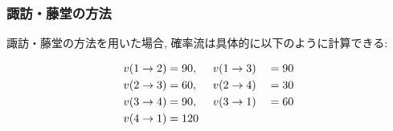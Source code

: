 \subsubsection{諏訪・藤堂の方法}
諏訪・藤堂の方法を用いた場合, 確率流は具体的に以下のように計算できる:

\begin{alignat}{4}
    v(1 \to 2) &= 90,~~~~ v(1 \to 3) &&= 90 \notag \\
    v(2 \to 3) &= 60,~~~~ v(2 \to 4) &&= 30 \notag \\
    v(3 \to 4) &= 90,~~~~ v(3 \to 1) &&= 60 \notag \\
    v(4 \to 1) &= 120 \notag
\end{alignat}

% 
% 

